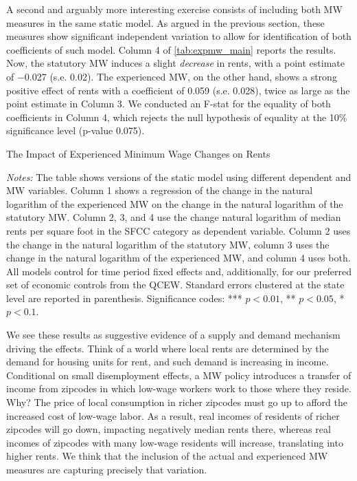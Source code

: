 A second and arguably more interesting exercise consists of including both MW measures in
the same static model. As argued in the previous section, these measures show significant
independent variation to allow for identification of both coefficients of such model. 
Column 4 of \autoref{tab:expmw_main} reports the results. Now, the statutory MW induces
a slight \textit{decrease} in rents, with a point estimate of $-$0.027 (s.e. 0.02). The 
experienced MW, on the other hand, shows a strong positive effect of rents with a 
coefficient of 0.059 (s.e. 0.028), twice as large as the point estimate in Column 3. We
conducted an F-stat for the equality of both coefficients in Column 4, which rejects the
null hypothesis of equality at the 10\% significance level (p-value 0.075). 

\begin{table}[h!]\centering
	\caption{The Impact of Experienced Minimum Wage Changes on Rents}
	\label{tab:expmw_main}
	
	\begin{minipage}{0.95\textwidth}\footnotesize
		\vspace{3mm}	
		\textit{Notes:} The table shows versions of the static model using different 
		dependent and MW variables. Column 1 shows a regression of the change in the natural 
		logarithm of the experienced MW on the change in the natural logarithm of the 
		statutory MW. Column 2, 3, and 4 use the change natural logarithm of median rents per 
		square foot in the SFCC category as dependent variable. Column 2 uses the change in 
		the natural logarithm of the statutory MW, column 3 uses the change in the natural 
		logarithm of the experienced MW, and column 4 uses both. All models control for time 
		period fixed effects and, additionally, for our preferred set of economic controls 
		from the QCEW. 
		Standard errors clustered at the state level are reported in parenthesis. Significance 
		codes: *** $p < 0.01$, ** $p < 0.05$, * $p < 0.1$.
	\end{minipage}
\end{table}

We see these results as suggestive evidence of a supply and demand mechanism driving the 
effects. Think of a world where local rents are determined by the demand for housing units
for rent, and such demand is increasing in income. Conditional on small disemployment effects, 
a MW policy introduces a transfer of income from zipcodes in which low-wage workers work to 
those where they reside. Why? The price of local consumption in richer zipcodes must go up 
to afford the increased cost of low-wage labor. As a result, real incomes of residents of 
richer zipcodes will go down, impacting negatively median rents there, whereas real incomes
of zipcodes with many low-wage residents will increase, translating into higher rents. 
We think that the inclusion of the actual and experienced MW measures are capturing precisely
that variation.


